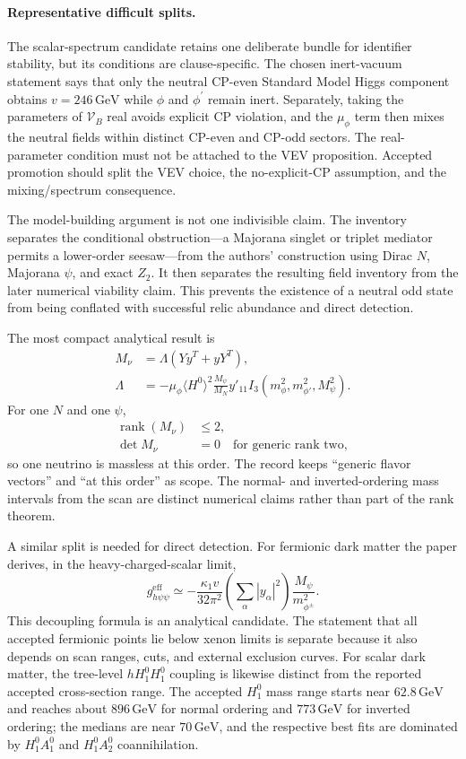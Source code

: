 \paragraph{Representative difficult splits.}
The scalar-spectrum candidate retains one deliberate bundle for identifier stability, but its conditions are clause-specific. The chosen inert-vacuum statement says that only the neutral CP-even Standard Model Higgs component obtains $v=246\,\mathrm{GeV}$ while $\phi$ and $\phi^{\prime}$ remain inert. Separately, taking the parameters of $\mathcal V_B$ real avoids explicit CP violation, and the $\mu_\phi$ term then mixes the neutral fields within distinct CP-even and CP-odd sectors. The real-parameter condition must not be attached to the VEV proposition. Accepted promotion should split the VEV choice, the no-explicit-CP assumption, and the mixing/spectrum consequence.

The model-building argument is not one indivisible claim. The inventory
separates the conditional obstruction---a Majorana singlet or triplet mediator
permits a lower-order seesaw---from the authors' construction using Dirac $N$,
Majorana $\psi$, and exact $Z_2$. It then separates the resulting field
inventory from the later numerical viability claim. This prevents the
existence of a neutral odd state from being conflated with successful relic
abundance and direct detection.

The most compact analytical result is
\[
\begin{aligned}
 M_\nu &= \Lambda\left(Yy^T+yY^T\right),\\
 \Lambda &=-\mu_\phi\langle H^0\rangle^2
 \frac{M_\psi}{M_N}y'_{11}
 I_3(m_\phi^2,m_{\phi'}^2,M_\psi^2).
\end{aligned}
\]
For one $N$ and one $\psi$,
\[
\begin{aligned}
 \operatorname{rank}(M_\nu)&\leq 2,\\
 \det M_\nu&=0
 \quad\text{for generic rank two},
\end{aligned}
\]
so one neutrino is massless at this order. The record keeps ``generic flavor
vectors'' and ``at this order'' as scope. The normal- and inverted-ordering
mass intervals from the scan are distinct numerical claims rather than part of
the rank theorem.

A similar split is needed for direct detection. For fermionic dark matter the
paper derives, in the heavy-charged-scalar limit,
\[
 g_{h\psi\psi}^{\mathrm{eff}}
 \simeq-\frac{\kappa_1v}{32\pi^2}
 \left(\sum_\alpha|y_\alpha|^2\right)
 \frac{M_\psi}{m_{\phi^\pm}^2}.
\]
This decoupling formula is an analytical candidate. The statement that all
accepted fermionic points lie below xenon limits is separate because it also
depends on scan ranges, cuts, and external exclusion curves. For scalar dark
matter, the tree-level $hH_1^0H_1^0$ coupling is likewise distinct from the
reported accepted cross-section range. The accepted $H_1^0$ mass range starts
near $62.8\,\mathrm{GeV}$ and reaches about $896\,\mathrm{GeV}$ for normal
ordering and $773\,\mathrm{GeV}$ for inverted ordering; the medians are near
$70\,\mathrm{GeV}$, and the respective best fits are dominated by
$H_1^0A_1^0$ and $H_1^0A_2^0$ coannihilation.

